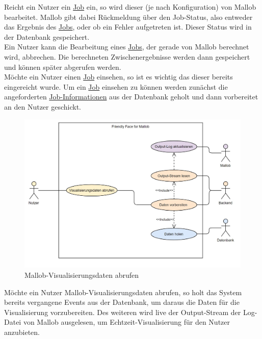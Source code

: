 Reicht ein \gls{Nutzer} ein \hyperref[B:Jobs]{Job} ein, so wird dieser (je nach Konfiguration) von Mallob bearbeitet. Mallob gibt dabei Rückmeldung über den Job-Status, also entweder das Ergebnis des \hyperref[B:Jobs]{Jobs}, oder ob ein Fehler aufgetreten ist. Dieser Status wird in der \gls{Datenbank} gespeichert. \\
Ein \gls{Nutzer} kann die Bearbeitung eines \hyperref[B:Jobs]{Jobs}, der gerade von Mallob berechnet wird, abbrechen. Die berechneten Zwischenergebnisse werden dann gespeichert und können später abgerufen werden. \\
Möchte ein \gls{Nutzer} einen \hyperref[B:Jobs]{Job} einsehen, so ist es wichtig das dieser bereits eingereicht wurde. Um ein \hyperref[B:Jobs]{Job} einsehen zu können werden zunächst die angeforderten \hyperref[B:Job-Informationen]{Job-Informationen} aus der \gls{Datenbank} geholt und dann vorbereitet an den \gls{Nutzer} geschickt.




\begin{figure}[H]
    \centering
    \includegraphics[width=\textwidth]{images-interface/Diagramme/visualisierungsdaten_anwendungsfaelle.jpg}
    \caption{Mallob-Visualisierungsdaten abrufen}
\end{figure}
Möchte ein \gls{Nutzer} Mallob-Visualisierungsdaten abrufen, so holt das System bereits vergangene Events aus der \gls{Datenbank}, um daraus die Daten für die Visualisierung vorzubereiten. Des weiteren wird live der Output-\gls{Stream} der \gls{Log-Datei} von Mallob ausgelesen, um Echtzeit-Visualisierung für den \gls{Nutzer} anzubieten. 


